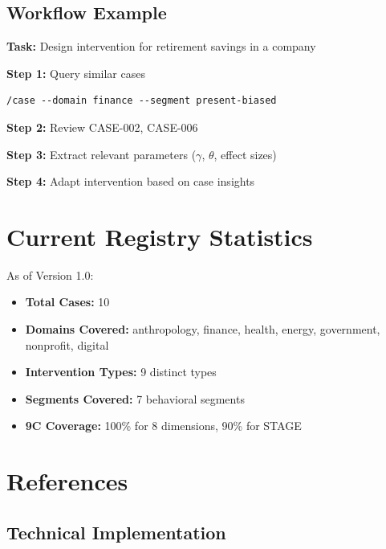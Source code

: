 \subsection{Workflow Example}

\begin{tcolorbox}[colback=gray!5, colframe=gray!50]
\textbf{Task:} Design intervention for retirement savings in a company

\textbf{Step 1:} Query similar cases
\begin{verbatim}
/case --domain finance --segment present-biased
\end{verbatim}

\textbf{Step 2:} Review CASE-002, CASE-006

\textbf{Step 3:} Extract relevant parameters ($\gamma$, $\theta$, effect sizes)

\textbf{Step 4:} Adapt intervention based on case insights
\end{tcolorbox}

\section{Current Registry Statistics}

As of Version 1.0:

\begin{itemize}
    \item \textbf{Total Cases:} 10
    \item \textbf{Domains Covered:} anthropology, finance, health, energy, government, nonprofit, digital
    \item \textbf{Intervention Types:} 9 distinct types
    \item \textbf{Segments Covered:} 7 behavioral segments
    \item \textbf{9C Coverage:} 100\% for 8 dimensions, 90\% for STAGE
\end{itemize}

\section{References}

\subsection{Technical Implementation}

